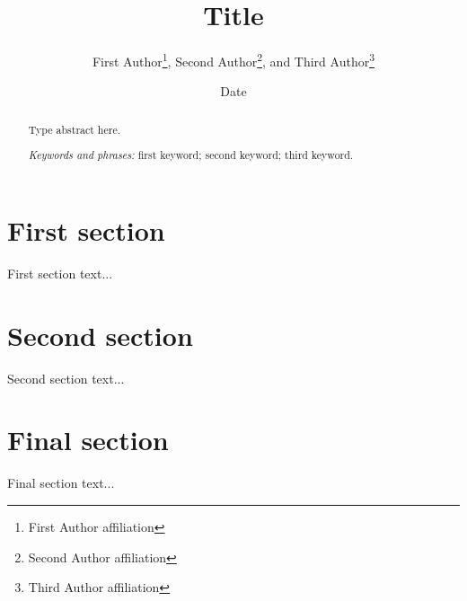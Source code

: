 \documentclass[a4paper, 12pt]{article}
\title{Title}
\author{First Author\footnote{First Author affiliation}, \; Second Author\footnote{Second Author affiliation}, \; and Third Author\footnote{Third Author affiliation}}
\date{
Date %
}
\theoremstyle{plain}
\theoremstyle{definition}
\theoremstyle{remark}
\begin{document}
\maketitle 

\thispagestyle{fancy}

\begin{abstract}    
Type abstract here.

\smallskip

\emph{Keywords and phrases:} first keyword; second keyword; third keyword.
\end{abstract}


\section{First section}


First section text...






\section{Second section}

Second section text...







\section{Final section}
Final section text...









\end{document}
